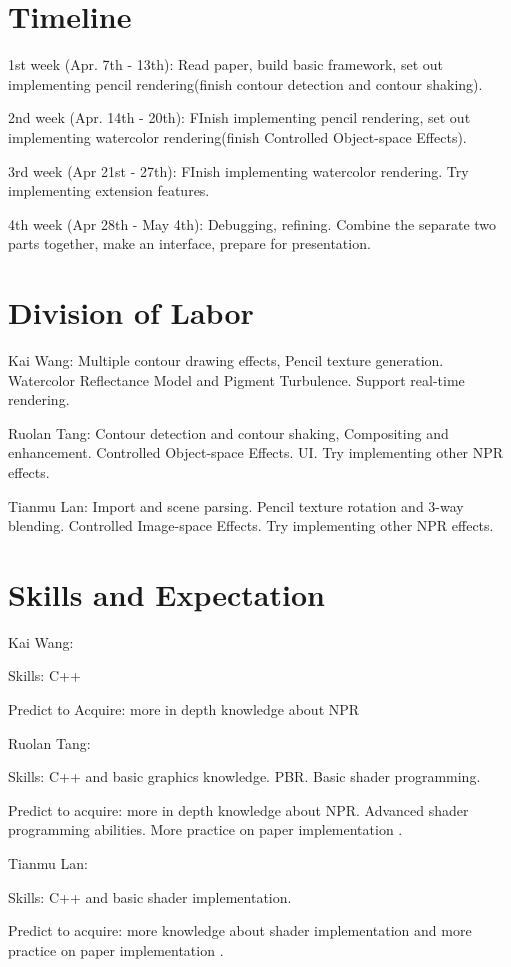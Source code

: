 \documentclass[acmtog, table, dvipsnames]{acmart}
\begin{document}
\section{Timeline}
1st week (Apr. 7th - 13th): Read paper, build basic framework, set out implementing pencil rendering(finish contour detection and contour shaking).

2nd week (Apr. 14th - 20th): FInish implementing pencil rendering, set out implementing watercolor rendering(finish Controlled Object-space Effects).

3rd week (Apr 21st - 27th): FInish implementing watercolor rendering. Try implementing extension features.

4th week (Apr 28th - May 4th): Debugging, refining. Combine the separate two parts together, make an interface, prepare for presentation.

\section{Division of Labor}
Kai Wang: Multiple contour drawing effects, Pencil texture generation. Watercolor Reflectance Model and Pigment Turbulence. Support real-time rendering.

Ruolan Tang: Contour detection and contour shaking, Compositing and enhancement. Controlled Object-space Effects. UI. Try implementing other NPR effects.

Tianmu Lan: Import and scene parsing. Pencil texture rotation and 3-way blending. Controlled Image-space Effects. Try implementing other NPR effects.

\section{Skills and Expectation}
Kai Wang:

Skills: C++

Predict to Acquire: more in depth knowledge about NPR

Ruolan Tang: 

Skills: C++ and basic graphics knowledge. PBR. Basic shader programming.

Predict to acquire: more in depth knowledge about NPR. Advanced shader programming abilities. More practice on paper implementation .

Tianmu Lan:

Skills: C++ and basic shader implementation.

Predict to acquire: more knowledge about shader implementation and more practice on paper implementation .



\end{document}
